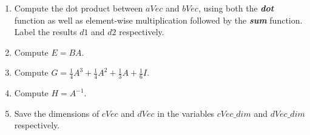 \documentclass[11pt]{article}
\newenvironment{qparts}{\begin{enumerate}[{(}a{)}]}{\end{enumerate}}
\begin{document}
\begin{qparts}

    \item  Compute the dot product between $aVec$ and $bVec$, using both the
    \textbf{\textit{dot}} function as well as element-wise multiplication
    followed by the \textbf{\textit{sum}} function.
    Label the results $d1$ and $d2$ respectively.

    \item Compute $E = BA$.

    \item Compute 
    $G = \frac{1}{4}A^3 + \frac{1}{4}A^2 + \frac{1}{3}A + \frac{1}{6}I$. 

    \item Compute $H = A^{-1}$.

    \item Save the dimensions of $cVec$ and $dVec$ in the variables $cVec\_dim$ and
    $dVec\_dim$ respectively.

\end{qparts}
\end{document}
